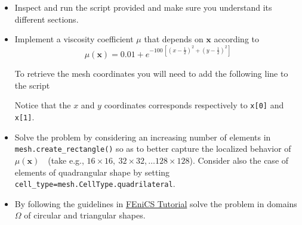 \begin{kaobox}[frametitle=Implement the following modifications to \texttt{basic\_poisson.py}]

\begin{itemize}
\item Inspect and run the script provided and make sure you understand its different
sections.\\

\item Implement a viscosity coefficient $\mu$ that depends on $\mathbf{x}$
according to
\begin{equation}
\mu(\mathbf{x}) = 0.01 + e^{-100\,\left [(x-\frac12)^2 + (y-\frac12)^2 \right ]} \nonumber
\end{equation}

To retrieve the mesh coordinates you will need to add the following line to the script
\begin{center}
\begin{minipage}{0.7\textwidth}
    
\end{minipage}
\end{center}
Notice that the $x$ and $y$ coordinates corresponds respectively
to \texttt{x[0]} and \texttt{x[1]}.\\

\item Solve the problem by considering an increasing number of elements
in \texttt{mesh.create\_rectangle()} so as to better capture the localized
behavior of $\mu(\mathbf{x})$~~(take e.g., $16\times 16,~32\times 32, \dots 128\times 128$).
Consider also the case of elements of quadrangular shape by setting
\texttt{cell\_type=mesh.CellType.quadrilateral}.\\

\item By following the guidelines in
\href{https://jorgensd.github.io/dolfinx-tutorial/chapter1/membrane_code.html}{FEniCS Tutorial}
solve the problem in domains $\Omega$ of circular and triangular shapes.\\


\end{itemize}
\end{kaobox}
